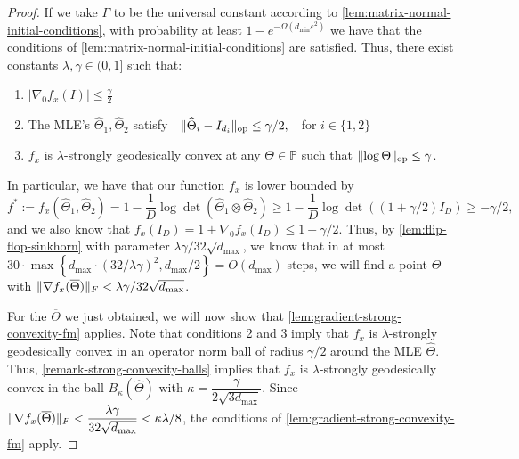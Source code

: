 \documentclass[aos]{imsart}
\theoremstyle{definition}
\numberwithin{equation}{section}
\DeclareMathOperator{\op}{op}
\DeclarePairedDelimiter{\norm}{\lVert}{\rVert}
\newcommand{\otheta}{\overline{\Theta}}
\newcommand{\htheta}{\widehat{\Theta}}
\newcommand{\SPD}{\mathbb{P}}
\def\dmin{d_{\min}}
\def\dmax{d_{\max}}
\newcommand{\CF}[1]{{\color{purple}[CF: #1]}}
\newcommand{\CF}[1]{{}}
\begin{document}
\begin{proof}
If we take $\Gamma$ to be the universal constant according to \cref{lem:matrix-normal-initial-conditions}, with probability at least $1 - e^{- \Omega(\dmin \varepsilon^2)}$ we have that the conditions of \cref{lem:matrix-normal-initial-conditions} are satisfied.
Thus, there exist constants $\lambda, \gamma \in (0, 1]$ such that:
\begin{enumerate}
	\item $|\nabla_0 f_x(I)| \leq \frac{\gamma}{2}$
	\item The MLE's $\htheta_1, \htheta_2$ satisfy $\ \ \norm{\htheta_i - I_{d_i}}_{\op} \leq \gamma/2, \ \ $ for $i \in \{1,2\}$
	\item $f_x$ is $\lambda$-strongly geodesically convex at any $\Theta \in \SPD$ such that $\norm{\log \Theta}_{\op} \leq \gamma$.
\end{enumerate}
In particular, we have that our function $f_x$ is lower bounded by
$$f^* := f_x(\htheta_1, \htheta_2) = 1 - \dfrac{1}{D} \log\det(\htheta_1 \otimes \htheta_2) \geq 1 - \dfrac{1}{D} \log\det((1+\gamma/2) I_D) \geq - \gamma/2,  $$
and we also know that $f_x(I_D) = 1 + \nabla_0 f_x(I_D) \leq 1 + \gamma/2$. Thus, by \cref{lem:flip-flop-sinkhorn} with parameter $\lambda \gamma/32 \sqrt{\dmax}$, we know that in at most
$30  \cdot \max\left\{ \dmax \cdot \left(32/\lambda \gamma\right)^2, \dmax/2 \right\} = O(\dmax)$ steps, we will find a point $\otheta$ with $\norm{\nabla f_x(\otheta)}_F < \lambda \gamma /32 \sqrt{\dmax}$.

For the $\otheta$ we just obtained, we will now show that \cref{lem:gradient-strong-convexity-fm} applies.
Note that conditions 2 and 3 imply that $f_x$ is $\lambda$-strongly geodesically convex in an operator norm ball of radius $\gamma/2$ around the MLE $\htheta$.
Thus, \cref{remark-strong-convexity-balls} implies that $f_x$ is $\lambda$-strongly geodesically convex in the ball $B_\kappa(\htheta)$ with $\kappa = \dfrac{\gamma}{2\sqrt{3\dmax}}$.
Since $\norm{\nabla f_x(\otheta)}_F < \dfrac{\lambda \gamma}{32 \sqrt{\dmax}} < \kappa \lambda/8$, the conditions of \cref{lem:gradient-strong-convexity-fm} apply.


\end{proof}
\end{document}
